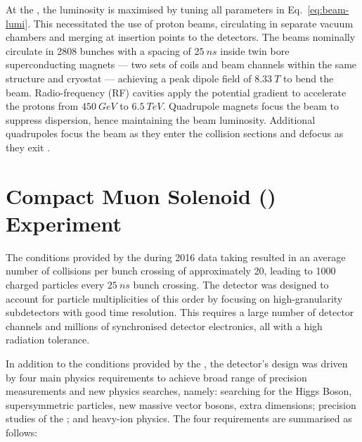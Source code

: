 At the \LHC, the luminosity is maximised by tuning all parameters in
Eq.~\eqref{eq:beam-lumi}. This necessitated the use of proton beams, circulating
in separate vacuum chambers and merging at insertion points to the detectors.
The beams nominally circulate in 2808 bunches with a spacing of ${\SI{25}{ns}}$
inside twin bore superconducting magnets --- two sets of coils and beam channels
within the same structure and cryostat --- achieving a peak dipole field of
${\SI{8.33}{T}}$ to bend the beam. Radio-frequency (RF) cavities apply the
potential gradient to accelerate the protons from ${\SI{450}{GeV}}$ to
${\SI{6.5}{TeV}}$. Quadrupole magnets focus the beam to suppress dispersion,
hence maintaining the beam luminosity. Additional quadrupoles focus the
beam as they enter the collision sections and defocus as they exit 
\cite{Bruning:782076}.

\section{Compact Muon Solenoid (\CMS) Experiment}

The conditions provided by the \LHC during 2016 data taking resulted in an
average number of collisions per bunch crossing of approximately 20, leading
to 1000 charged particles every ${\SI{25}{ns}}$ bunch crossing. The \CMS detector
was designed to account for particle multiplicities of this order by focusing on
high-granularity subdetectors with good time resolution. This requires a large
number of detector channels and millions of synchronised detector electronics, all
with a high radiation tolerance.

In addition to the conditions provided by the \LHC, the \CMS detector's design was
driven by four main physics requirements to achieve broad range of precision
measurements and new physics searches, namely: searching for the Higgs Boson,
supersymmetric particles, new massive vector bosons, extra dimensions; precision
studies of the \SM; and heavy-ion physics. The four requirements are summarised
as follows:

